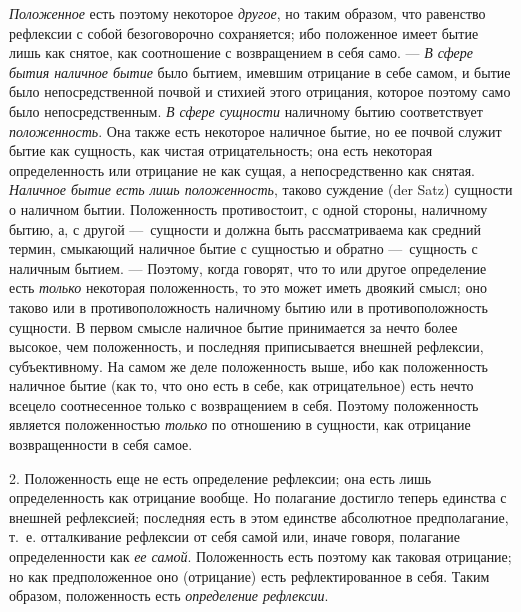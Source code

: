 {\em Положенное} есть поэтому некоторое
{\em другое}, но таким образом, что равенство рефлексии
с собой безоговорочно сохраняется; ибо положенное имеет бытие лишь как
снятое, как соотношение с возвращением в себя само. —
{\em В сфере бытия наличное бытие }было бытием, имевшим
отрицание в себе самом, и бытие было непосредственной почвой и стихией
этого отрицания, которое поэтому само было непосредственным.
{\em В сфере сущности} наличному бытию соответствует
{\em положенность}. Она также есть некоторое наличное
бытие, но ее почвой служит бытие как сущность, как чистая отрицательность;
она есть некоторая определенность или отрицание не как сущая, а
непосредственно как снятая. {\em Наличное бытие есть
лишь положенность}, таково суждение (der Satz) сущности о наличном бытии.
Положенность противостоит, с одной стороны, наличному бытию, а, с другой
—~сущности и должна быть рассматриваема как средний термин, смыкающий
наличное бытие с сущностью и обратно —~сущность с наличным бытием. —
Поэтому, когда говорят, что то или другое определение есть
{\em только} некоторая положенность, то это может иметь
двоякий смысл; оно таково или в противоположность наличному бытию или в
противоположность сущности. В первом смысле наличное бытие принимается за
нечто более высокое, чем положенность, и последняя приписывается внешней
рефлексии, субъективному. На самом же деле положенность выше, ибо как
положенность наличное бытие (как то, что оно есть в себе, как
отрицательное) есть нечто всецело соотнесенное только с возвращением в
себя. Поэтому положенность является положенностью
{\em только} по отношению в сущности, как отрицание
возвращенности в себя самое.

2. Положенность еще не есть определение рефлексии; она есть лишь
определенность как отрицание вообще. Но полагание достигло теперь единства
с внешней рефлексией; последняя есть в этом единстве абсолютное
предполагание, т.~е. отталкивание рефлексии от себя самой или, иначе
говоря, полагание определенности как {\em ее самой}.
Положенность есть поэтому как таковая отрицание; но как предположенное оно
(отрицание) есть рефлектированное в себя. Таким образом, положенность есть
{\em определение рефлексии}.

